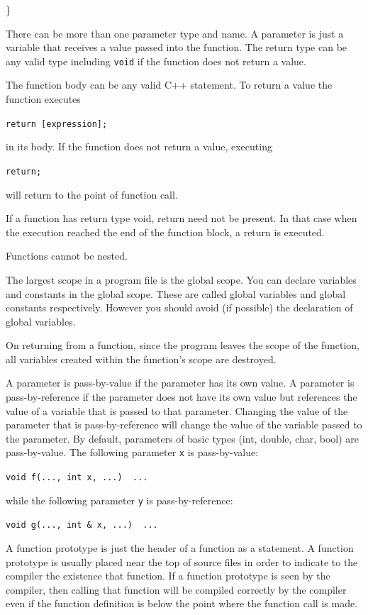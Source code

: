 \}

There can be more than one parameter type and name. A parameter is just a variable that receives a value passed into the function. The return type can be any valid type including \texttt{void} if the function does not return a value.

The function body can be any valid C++ statement. To return a value the
function executes

\texttt{return [expression];}

in its body. If the function does not return a value, executing
\begin{center}
\texttt{return;}
\end{center}
will return to the point of function call.

If a function has return type void, return need not be present. In that case when the execution reached the end of the function block, a return is executed.

Functions cannot be nested.

The largest scope in a program file is the global scope. You can declare variables and constants in the global scope. These are called global variables and global constants respectively. However you should avoid (if possible) the declaration of global variables.

On returning from a function, since the program leaves the scope of the function, all variables created within the function's scope are destroyed.

A parameter is pass-by-value if the parameter has its own value. A parameter is pass-by-reference if the parameter does not have its own value but references the value of a variable that is passed to that parameter. Changing the value of the parameter that is pass-by-reference will change the value of the variable passed to the parameter. By default, parameters of basic types (int, double, char, bool) are pass-by-value. The following parameter \texttt{x} is pass-by-value:
\begin{center}
\texttt{void f(..., int x, ...) { ... }}
\end{center}
while the following parameter \texttt{y} is pass-by-reference:
\begin{center}
\texttt{void g(..., int \& x, ...) { ... }}
\end{center}
A function prototype is just the header of a function as a statement. A function prototype is usually placed near the top of source files in order to indicate to the compiler the existence that function. If a function prototype is seen by the compiler, then calling that function will be compiled correctly by the compiler even if the function definition is below the point where the function call is made.

\newpage{}






